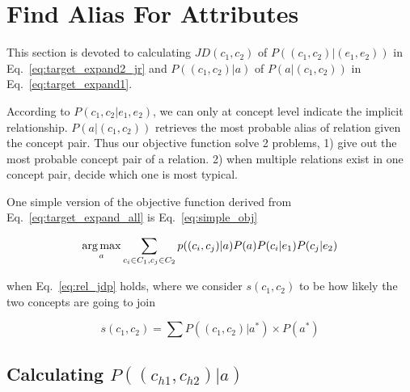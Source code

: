 \section{Find Alias For Attributes}
\label{sec:fafa}





This section is devoted to calculating $JD(c_1,c_2)$ of $P((c_{1},c_{2})|(e_{1},e_{2}))$ in Eq.~\ref{eq:target_expand2_jr} and $P((c_{1},c_{2})|a)$ of $P(a|(c_{1},c_{2}))$ in Eq.~\ref{eq:target_expand1}.

According to $P(c_1,c_2|e_1,e_2)$, we can only at concept level indicate the implicit relationship. $P(a|(c_{1},c_{2}))$ retrieves the most probable alias of relation given the concept pair. Thus our objective function solve 2 problems, 1) give out the most probable concept pair of a relation. 2) when multiple relations exist in one concept pair, decide which one is most typical.




One simple version of the objective function derived from Eq.~\ref{eq:target_expand_all} is Eq.~\ref{eq:simple_obj}

\begin{equation}
\label{eq:simple_obj}
 \operatorname*{arg\,max}_a \sum_{c_i\in C_1, c_j\in C_2} p((c_{i},c_{j})|a) P(a) P(c_i|e_1) P(c_j|e_2) 
\end{equation}

  when Eq.~\ref{eq:rel_jdp} holds, where we consider $s(c_1,c_2)$ to be how likely the two concepts are going to join

\begin{equation}\label{eq:rel_jdp}
  s(c_1,c_2) = \sum{ P((c_{1},c_{2})|a^*) \times P(a^*)}
\end{equation}




\subsection{Calculating $P((c_{h1},c_{h2})|a)$ }

